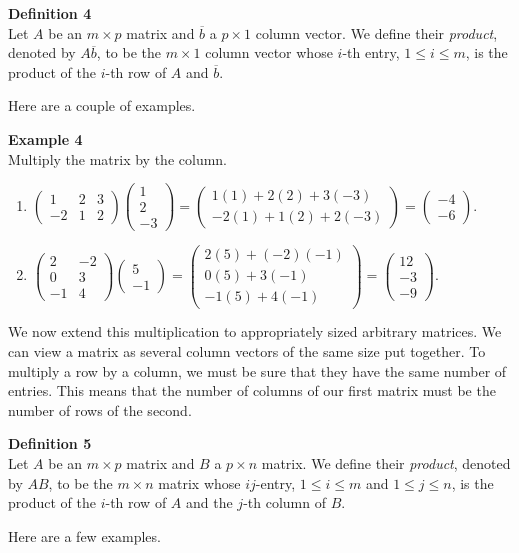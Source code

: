 \documentclass[12pt]{article}
\def\it{\item}
\def\be{\begin{enumerate}} \def\ee{\end{enumerate}}
\def\lp{\left(} \def\rp{\right)} \def\abs#1{\vert #1 \vert}
\def\bar#1{\overline{#1}}
\def\colt#1#2{\lp \begin{array}{rr} #1 \\ #2 \end{array} \rp}
\def\colth#1#2#3{\lp \begin{array}{rrr} #1 \\ #2 \\ #3 \end{array} \rp}
\begin{document}
\begin{framed}
{\bf Definition 4} \\
Let $A$ be an $m \times p$ matrix and $\bar{b}$ a $p \times 1$ column vector. We define their {\itshape product}, denoted by $A\bar{b}$, to be the $m \times 1$ column vector whose $i$-th entry, $1 \leq i \leq m$, is the product of the $i$-th row of $A$ and $\bar{b}$.
\end{framed}

Here are a couple of examples. 

{\bf Example 4} \\
Multiply the matrix by the column.
\be
\it $\lp \begin{array}{rrr} 1 & 2 & 3 \\ -2 & 1 & 2 \end{array} \rp \colth{1}{2}{-3} = \colt{1(1)+2(2)+3(-3)}{-2(1)+1(2)+2(-3)} = \colt{-4}{-6}$.
\it $\lp \begin{array}{rr} 2 & -2 \\ 0 & 3 \\ -1 & 4 \end{array} \rp \colt{5}{-1} = \begin{pmatrix} 2(5)+(-2)(-1) \\ 0(5)+3(-1) \\ -1(5)+4(-1) \end{pmatrix} = \colth{12}{-3}{-9}$.
\ee

We now extend this multiplication to appropriately sized arbitrary matrices. We can view a matrix as several column vectors of the same size put together. To multiply a row by a column, we must be sure that they have the same number of entries. This means that the number of columns of our first matrix must be the number of rows of the second. 

\begin{framed}
{\bf Definition 5} \\
Let $A$ be an $m \times p$ matrix and $B$ a $p \times n$ matrix. We define their {\itshape product}, denoted by $AB$,  to be the $m \times n$ matrix whose $ij$-entry, $1 \leq i \leq m$ and $1 \leq j \leq n$, is the product of the $i$-th row of $A$ and the $j$-th column of $B$.
\end{framed}

Here are a few examples.
\end{document}

